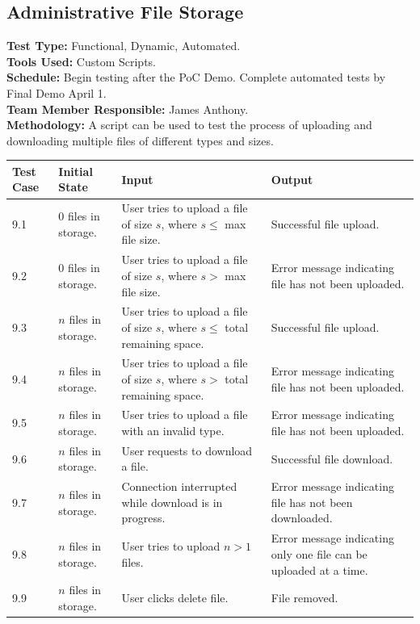 \documentclass[12pt]{article}
\begin{document}
\subsection{Administrative File Storage}
\textbf{Test Type:} Functional, Dynamic, Automated. \\
\textbf{Tools Used:} Custom Scripts. \\
\textbf{Schedule:} Begin testing after the PoC Demo. Complete automated tests by Final Demo April 1. \\
\textbf{Team Member Responsible:} James Anthony. \\
\textbf{Methodology:} A script can be used to test the process of uploading and downloading multiple files of different types and sizes.

\begin{longtable}{|p{2cm}|p{3cm}|p{5cm}|p{5cm}|}
\hline
\textbf{Test Case} & \textbf{Initial State} & \textbf{Input} & \textbf{Output} \\ \hline
9.1 & 0 files in storage. & User tries to upload a file of size $s$, where $s \le$ max file size. & Successful file upload.\\
\hline
9.2 & 0 files in storage. & User tries to upload a file of size $s$, where $s >$ max file size. & Error message indicating file has not been uploaded.\\
\hline
9.3 & $n$ files in storage. & User tries to upload a file of size $s$, where $s \le$ total remaining space. & Successful file upload.\\
\hline
9.4 & $n$ files in storage. & User tries to upload a file of size $s$, where $s >$ total remaining space. & Error message indicating file has not been uploaded.\\
\hline
9.5 & $n$ files in storage. & User tries to upload a file with an invalid type. & Error message indicating file has not been uploaded.\\
\hline
9.6 & $n$ files in storage. & User requests to download a file. & Successful file download.\\
\hline
9.7 & $n$ files in storage. & Connection interrupted while download is in progress. & Error message indicating file has not been downloaded.\\
\hline
9.8 & $n$ files in storage. & User tries to upload  $n > 1$ files. & Error message indicating only one file can be uploaded at a time.\\
\hline
9.9 & $n$ files in storage. & User clicks delete file. & File removed. \\
\hline
\end{longtable}
\end{document}
